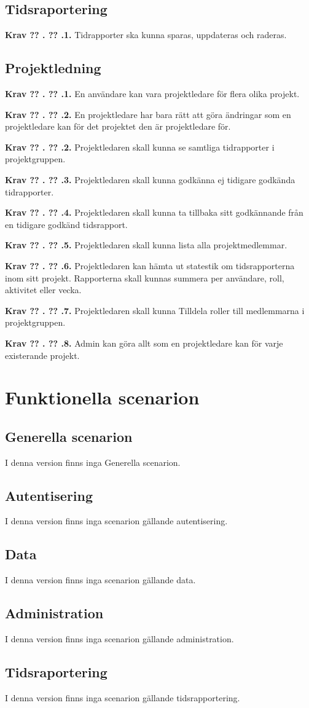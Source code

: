 \documentclass[a4paper]{article}
\newcommand\getcurrentref[1]{%
 \ifnumequal{\value{#1}}{0}
  {??}
  {\the\value{#1}}%
}
\newcommand\requirement[2]{
	\numberedrow{Krav}{#1}{#2}
}
\newcommand\numberedrow[3]{
	\noindent
	\textbf{#1 \getcurrentref{section}.\getcurrentref{subsection}.#2.} #3
	
}
\begin{document}
\subsection{Tidsraportering}
\requirement{1}{Tidrapporter ska kunna sparas, uppdateras och raderas.}
\subsection{Projektledning}
\requirement{1}{En användare kan vara projektledare för flera olika projekt.}
\requirement{2}{En projektledare har bara rätt att göra ändringar som en projektledare kan för det projektet den är projektledare för.}
\requirement{2}{Projektledaren skall kunna se samtliga tidrapporter i projektgruppen.}
\requirement{3}{Projektledaren skall kunna godkänna ej tidigare godkända tidrapporter.}
\requirement{4}{Projektledaren skall kunna ta tillbaka sitt godkännande från en tidigare godkänd tidsrapport.}
\requirement{5}{Projektledaren skall kunna lista alla projektmedlemmar.}
\requirement{6}{Projektledaren kan hämta ut statestik om tidsrapporterna inom sitt projekt. Rapporterna skall kunnas summera per användare, roll, aktivitet eller vecka.}
\requirement{7}{Projektledaren skall kunna Tilldela roller till medlemmarna i projektgruppen.}
\requirement{8}{Admin kan göra allt som en projektledare kan för varje existerande projekt.}
\section{Funktionella scenarion}
\label{scenarion}
\subsection{Generella scenarion}
I denna version finns inga Generella scenarion.
\subsection{Autentisering}
I denna version finns inga scenarion gällande autentisering.
\subsection{Data}
I denna version finns inga scenarion gällande data.
\subsection{Administration}
I denna version finns inga scenarion gällande administration.
\subsection{Tidsraportering}
I denna version finns inga scenarion gällande tidsrapportering.
\end{document}
